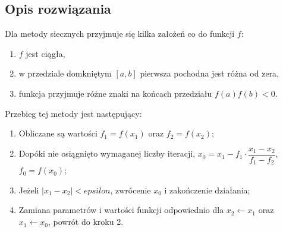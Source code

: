\documentclass{classrep}
\begin{document}
	\subsection{Opis rozwiązania}		
		Dla metody siecznych przyjmuje się kilka założeń co do funkcji $f$:
		\begin{enumerate}[1.]
			\item $f$ jest ciągła,
			\item w przedziale domkniętym $[a,b]$ pierwsza pochodna jest różna od zera,
			\item funkcja przyjmuje różne znaki na końcach przedziału $f(a)f(b)<0$.
		\end{enumerate}
		
		Przebieg tej metody jest następujący:
		\begin{enumerate}
			\item Obliczane są wartości $f_1=f(x_1)$ oraz $f_2=f(x_2)$;
			\item Dopóki nie osiągnięto wymaganej liczby iteracji, $x_0=x_1-f_1 \cdot \dfrac{x_1-x_2}{f_1-f_2}$, $f_0=f(x_0)$;
			\item Jeżeli $|x_1-x_2|<epsilon$, zwrócenie $x_0$ i zakończenie działania;
			\item Zamiana parametrów i wartości funkcji odpowiednio dla $x_2 \leftarrow x_1$ oraz $x_1 \leftarrow x_0$, powrót do kroku 2.
		\end{enumerate}
		
\end{document}
